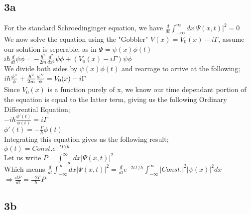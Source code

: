 \documentclass{article}
\begin{document}
\subsection*{3a}

For the standard Schroedinginger equation, we have $\frac{d}{dt}{\displaystyle \int_{-\infty}^{\infty}}dx|\Psi(x,t)|^2=0$\\

We now solve the equation using the "Gobbler" $V(x)=V_0(x)-i\Gamma$, assume our solution is seperable; as in $\Psi=\psi(x)\phi(t)$\\

$i\hbar\frac{d}{dt}\psi\phi=-\frac{\hbar^2}{2m}\frac{d^2}{dx^2}\psi\phi+(V_0(x)-i\Gamma)\psi\phi$\\

We divide both sides by $\psi(x)\phi(t)$ and rearrage to arrive at the following;\\

$i\hbar\frac{\phi"}{\phi}+\frac{\hbar^2}{2m}\frac{\psi''}{\psi}=V_0(x)-i\Gamma$\\

Since $V_0(x)$ is a function purely of x, we know our time dependant portion of the equation is equal to the latter term, giving us the following Ordinary Differential Equation;\\

$-i\hbar\frac{\phi'(t)}{\phi(t)}=i\Gamma$\\
$\phi'(t)=-\frac{\Gamma}{\hbar}\phi(t)$\\

Integrating this equation gives us the following result;\\

$\phi(t)=Const. e^{-t\Gamma/\hbar}$\\

Let us write $P={\displaystyle \int_{-\infty}^{\infty}}dx|\Psi(x,t)|^2$\\

Which means $\frac{d}{dt}{\displaystyle \int_{-\infty}^{\infty}}dx|\Psi(x,t)|^2=\frac{d}{dt}e^{-2t\Gamma/\hbar}{\displaystyle \int_{-\infty}^{\infty}}|Const.|^2|\psi(x)|^2dx$\\

$\Rightarrow \frac{dP}{dt}=\frac{-2\Gamma}{\hbar}P$\\

\subsection*{3b}
\end{document}
